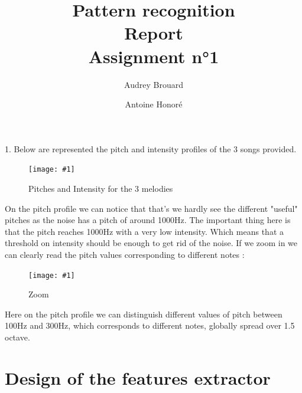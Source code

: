 \documentclass[a4paper]{report}
\title{Pattern recognition\\Report\\Assignment n°1}
\author{Audrey Brouard \and Antoine Honoré}
\newcommand{\img}[3]{\begin{figure}[!h] \centering \texttt{[image: \#1]}\captionsetup{justification=centering} \caption{#3} \label{#1} \end{figure}}
\begin{document}

\section{}


1. Below are represented the pitch and intensity profiles of the 3 songs provided. 
\img{Pitch_intens}{.8}{Pitches and Intensity for the 3 melodies}

On the pitch profile we can notice that that's we hardly see the different "useful" pitches as the noise has a pitch of around 1000Hz. The important thing here is that the pitch reaches 1000Hz with a very low intensity. Which means that a threshold on intensity should be enough to get rid of the noise. If we zoom in we can clearly read the pitch values corresponding to different notes :

\img{Pitch_intens_zoom}{.8}{Zoom}

Here on the pitch profile we can distinguish different values of pitch between 100Hz and 300Hz, which corresponds to different notes, globally spread over 1.5 octave.

\section{Design of the features extractor}
\end{document}
